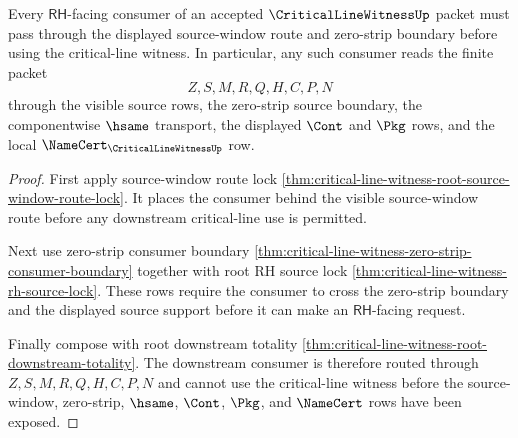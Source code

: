 \begin{theorem}
\label{thm:critical-line-witness-source-window-rh-boundary}
Every $\mathsf{RH}$-facing consumer of an accepted $\CriticalLineWitnessUp$
packet must pass through the displayed source-window route and zero-strip
boundary before using the critical-line witness. In particular, any such
consumer reads the finite packet
$$
Z,S,M,R,Q,H,C,P,N
$$
through the visible source rows, the zero-strip source boundary, the
componentwise $\hsame$ transport, the displayed $\Cont$ and $\Pkg$ rows, and
the local $\NameCert_{\CriticalLineWitnessUp}$ row.
\end{theorem}
\begin{proof}
First apply source-window route lock
\autoref{thm:critical-line-witness-root-source-window-route-lock}. It places the
consumer behind the visible source-window route before any downstream
critical-line use is permitted.

Next use zero-strip consumer boundary
\autoref{thm:critical-line-witness-zero-strip-consumer-boundary} together with
root RH source lock \autoref{thm:critical-line-witness-rh-source-lock}. These
rows require the consumer to cross the zero-strip boundary and the displayed
source support before it can make an $\mathsf{RH}$-facing request.

Finally compose with root downstream totality
\autoref{thm:critical-line-witness-root-downstream-totality}. The downstream
consumer is therefore routed through $Z,S,M,R,Q,H,C,P,N$ and cannot use the
critical-line witness before the source-window, zero-strip, $\hsame$, $\Cont$,
$\Pkg$, and $\NameCert$ rows have been exposed.
\end{proof}

